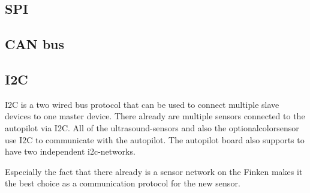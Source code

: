 \subsection{SPI}

\subsection{CAN bus}

\subsection{I2C}
I2C is a two wired bus protocol that can be used to connect multiple slave devices to one master device.
There already are multiple sensors connected to the autopilot via I2C.
All of the ultrasound-sensors and also the optionalcolorsensor use I2C to communicate with the autopilot.
The autopilot board also supports to have two independent i2c-networks.

Especially the fact that there already is a sensor network on the Finken makes it the best choice as a communication protocol for the new sensor.


